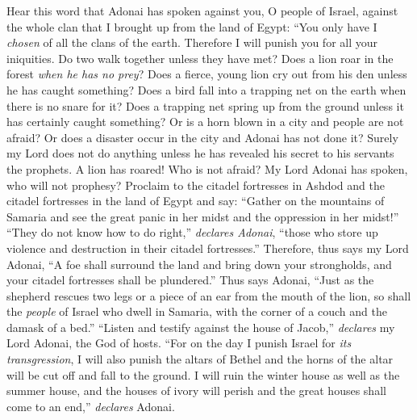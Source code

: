 \begin{biblechapter} %
 Hear this word that Adonai has spoken against you, O people of Israel, against the whole clan that I brought up from the land of Egypt:
\verse “You only have I \textit{chosen} of all the clans of the earth. Therefore I will punish you for all your iniquities.
\verse Do two walk together unless they have met?
\verse Does a lion roar in the forest \textit{when he has no prey}? Does a fierce, young lion cry out from his den unless he has caught something?
\verse Does a bird fall into a trapping net on the earth when there is no snare for it? Does a trapping net spring up from the ground unless it has certainly caught something?
\verse Or is a horn blown in a city and people are not afraid? Or does a disaster occur in the city and Adonai has not done it?
\verse Surely my Lord does not do anything unless he has revealed his secret to his servants the prophets.
\verse A lion has roared! Who is not afraid? My Lord Adonai has spoken, who will not prophesy?
\verse Proclaim to the citadel fortresses in Ashdod and the citadel fortresses in the land of Egypt and say: “Gather on the mountains of Samaria and see the great panic in her midst and the oppression in her midst!”
\verse “They do not know how to do right,” \textit{declares Adonai}, “those who store up violence and destruction in their citadel fortresses.”
\verse Therefore, thus says my Lord Adonai, “A foe shall surround the land and bring down your strongholds, and your citadel fortresses shall be plundered.”
\verse Thus says Adonai, “Just as the shepherd rescues two legs or a piece of an ear from the mouth of the lion, so shall the \textit{people} of Israel who dwell in Samaria, with the corner of a couch and the damask of a bed.”
\verse “Listen and testify against the house of Jacob,” \textit{declares} my Lord Adonai, the God of hosts.
\verse “For on the day I punish Israel for \textit{its transgression}, I will also punish the altars of Bethel and the horns of the altar will be cut off and fall to the ground.
\verse I will ruin the winter house as well as the summer house, and the houses of ivory will perish and the great houses shall come to an end,” \textit{declares} Adonai.
\end{biblechapter}

